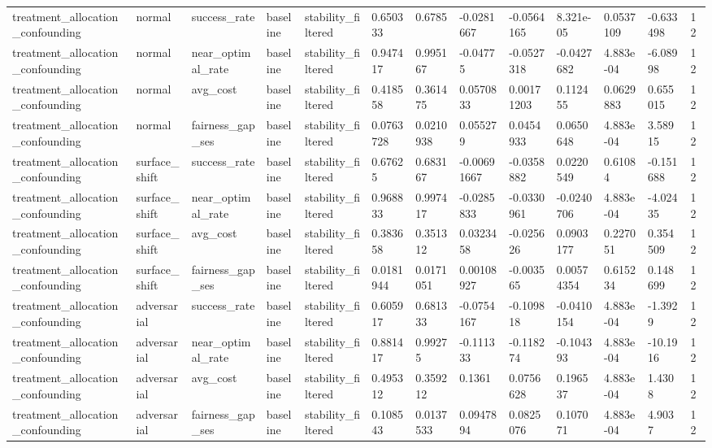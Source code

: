 \begin{tabular}{lllllllllllll}
treatment\_allocation\_confounding & normal & success\_rate & baseline & stability\_filtered & 0.650333 & 0.6785 & -0.0281667 & -0.0564165 & 8.321e-05 & 0.0537109 & -0.633498 & 12 \\
treatment\_allocation\_confounding & normal & near\_optimal\_rate & baseline & stability\_filtered & 0.947417 & 0.995167 & -0.04775 & -0.0527318 & -0.0427682 & 4.883e-04 & -6.08998 & 12 \\
treatment\_allocation\_confounding & normal & avg\_cost & baseline & stability\_filtered & 0.418558 & 0.361475 & 0.0570833 & 0.00171203 & 0.112455 & 0.0629883 & 0.655015 & 12 \\
treatment\_allocation\_confounding & normal & fairness\_gap\_ses & baseline & stability\_filtered & 0.0763728 & 0.0210938 & 0.055279 & 0.0454933 & 0.0650648 & 4.883e-04 & 3.58915 & 12 \\
treatment\_allocation\_confounding & surface\_shift & success\_rate & baseline & stability\_filtered & 0.67625 & 0.683167 & -0.00691667 & -0.0358882 & 0.0220549 & 0.61084 & -0.151688 & 12 \\
treatment\_allocation\_confounding & surface\_shift & near\_optimal\_rate & baseline & stability\_filtered & 0.968833 & 0.997417 & -0.0285833 & -0.0330961 & -0.0240706 & 4.883e-04 & -4.02435 & 12 \\
treatment\_allocation\_confounding & surface\_shift & avg\_cost & baseline & stability\_filtered & 0.383658 & 0.351312 & 0.0323458 & -0.025626 & 0.0903177 & 0.227051 & 0.354509 & 12 \\
treatment\_allocation\_confounding & surface\_shift & fairness\_gap\_ses & baseline & stability\_filtered & 0.0181944 & 0.0171051 & 0.00108927 & -0.003565 & 0.00574354 & 0.615234 & 0.148699 & 12 \\
treatment\_allocation\_confounding & adversarial & success\_rate & baseline & stability\_filtered & 0.605917 & 0.681333 & -0.0754167 & -0.109818 & -0.0410154 & 4.883e-04 & -1.3929 & 12 \\
treatment\_allocation\_confounding & adversarial & near\_optimal\_rate & baseline & stability\_filtered & 0.881417 & 0.99275 & -0.111333 & -0.118274 & -0.104393 & 4.883e-04 & -10.1916 & 12 \\
treatment\_allocation\_confounding & adversarial & avg\_cost & baseline & stability\_filtered & 0.495312 & 0.359212 & 0.1361 & 0.0756628 & 0.196537 & 4.883e-04 & 1.4308 & 12 \\
treatment\_allocation\_confounding & adversarial & fairness\_gap\_ses & baseline & stability\_filtered & 0.108543 & 0.0137533 & 0.0947894 & 0.0825076 & 0.107071 & 4.883e-04 & 4.9037 & 12 \\

\end{tabular}

